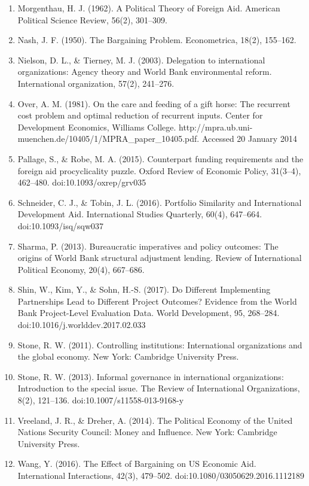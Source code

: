 \documentclass{article}
\begin{document}
\begin{singlespace}
\begin{enumerate}
	\item Morgenthau, H. J. (1962). A Political Theory of Foreign Aid. American Political Science Review, 56(2), 301–309.
	\item Nash, J. F. (1950). The Bargaining Problem. Econometrica, 18(2), 155–162.
	\item Nielson, D. L., \& Tierney, M. J. (2003). Delegation to international organizations: Agency theory and World Bank environmental reform. International organization, 57(2), 241–276.
	\item Over, A. M. (1981). On the care and feeding of a gift horse: The recurrent cost problem and optimal reduction of recurrent inputs. Center for Development Economics, Williams College. http://mpra.ub.uni-muenchen.de/10405/1/MPRA\_paper\_10405.pdf. Accessed 20 January 2014
	\item Pallage, S., \& Robe, M. A. (2015). Counterpart funding requirements and the foreign aid procyclicality puzzle. Oxford Review of Economic Policy, 31(3–4), 462–480. doi:10.1093/oxrep/grv035
	\item Schneider, C. J., \& Tobin, J. L. (2016). Portfolio Similarity and International Development Aid. International Studies Quarterly, 60(4), 647–664. doi:10.1093/isq/sqw037
	\item Sharma, P. (2013). Bureaucratic imperatives and policy outcomes: The origins of World Bank structural adjustment lending. Review of International Political Economy, 20(4), 667–686.
	\item Shin, W., Kim, Y., \& Sohn, H.-S. (2017). Do Different Implementing Partnerships Lead to Different Project Outcomes? Evidence from the World Bank Project-Level Evaluation Data. World Development, 95, 268–284. doi:10.1016/j.worlddev.2017.02.033
	\item Stone, R. W. (2011). Controlling institutions: International organizations and the global economy. New York: Cambridge University Press.
	\item Stone, R. W. (2013). Informal governance in international organizations: Introduction to the special issue. The Review of International Organizations, 8(2), 121–136. doi:10.1007/s11558-013-9168-y
	\item Vreeland, J. R., \& Dreher, A. (2014). The Political Economy of the United Nations Security Council: Money and Influence. New York: Cambridge University Press.
	\item Wang, Y. (2016). The Effect of Bargaining on US Economic Aid. International Interactions, 42(3), 479–502. doi:10.1080/03050629.2016.1112189

\end{enumerate}
\end{singlespace}
\end{document}
